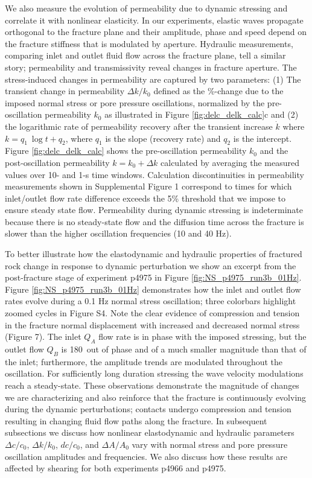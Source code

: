 \documentclass[draft]{agujournal2019}
\begin{document}
We also measure the evolution of permeability due to dynamic stressing and correlate it with nonlinear elasticity. In our experiments, elastic waves propagate orthogonal to the fracture plane and their amplitude, phase and speed depend on the fracture stiffness that is modulated by aperture. Hydraulic measurements, comparing inlet and outlet fluid flow across the fracture plane, tell a similar story; permeability and transmissivity reveal changes in fracture aperture.
The stress-induced changes in permeability are captured by two parameters: (1) The transient change in permeability $ \Delta k/k_0 $ defined as the \%-change due to the imposed normal stress or pore pressure oscillations, normalized by the pre-oscillation permeability $ k_0 $ as illustrated in Figure \ref{fig:delc_delk_calc}c \cite{Candela14} and (2) the logarithmic rate of permeability recovery after the transient increase $ \dot k $ where $ k = q_1\ \log{t} + q_2 $, where $q_1$ is the slope (recovery rate) and $q_2$ is the intercept.
Figure \ref{fig:delc_delk_calc} shows the pre-oscillation permeability $ k_0 $ and the post-oscillation permeability $ k = k_0 + \Delta k $ calculated by averaging the measured values over 10- and 1-s time windows. Calculation discontinuities in permeability measurements shown in Supplemental Figure 1 correspond to times for which inlet/outlet flow rate difference exceeds the 5\% threshold that we impose to ensure steady state flow. Permeability during dynamic stressing is indeterminate because there is no steady-state flow and the diffusion time across the fracture is slower than the higher oscillation frequencies (10 and  40 Hz). 

To better illustrate how the elastodynamic and hydraulic properties of fractured rock change in response to dynamic perturbation we show an excerpt from the post-fracture stage of experiment p4975 in Figure \ref{fig:NS_p4975_run3b_01Hz}.
Figure  \ref{fig:NS_p4975_run3b_01Hz} demonstrates how the inlet and outlet flow rates evolve during a 0.1 Hz normal stress oscillation; three colorbars highlight zoomed cycles in Figure S4. Note the clear evidence of compression and tension in the fracture normal displacement with increased and decreased normal stress (Figure 7). The inlet $ Q_A $ flow rate is in phase with the imposed stressing, but the outlet flow $ Q_B $ is 180\degree\ out of phase and of a much smaller magnitude than that of the inlet;  furthermore, the amplitude trends are modulated throughout the oscillation. For sufficiently long duration stressing the wave velocity modulations reach a steady-state. These observations demonstrate the magnitude of changes we are characterizing and also reinforce that the fracture is continuously evolving during the dynamic perturbations; contacts undergo compression and tension resulting in changing fluid flow paths along the fracture.
In subsequent subsections we discuss how nonlinear elastodynamic and hydraulic parameters $\Delta c/c_0$, $ \Delta k/k_0 $, $dc/c_0$, and $\Delta A/A_0$ vary with normal stress and pore pressure oscillation amplitudes and frequencies. We also discuss how these results are affected by shearing for both experiments p4966 and p4975.
\end{document}
